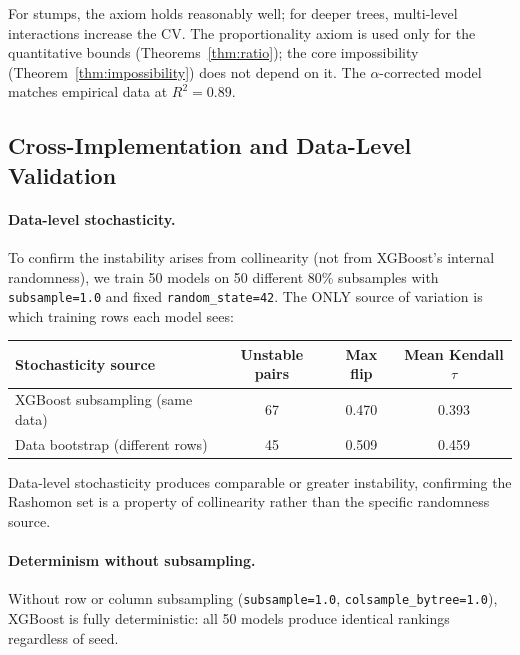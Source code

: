 \documentclass{jmlr}
\begin{document}
For stumps, the axiom holds reasonably well; for deeper trees, multi-level interactions increase the CV. The proportionality axiom is used only for the quantitative bounds (Theorems~\ref{thm:ratio}); the core impossibility (Theorem~\ref{thm:impossibility}) does not depend on it. The $\alpha$-corrected model matches empirical data at $R^2 = 0.89$.

\subsection{Cross-Implementation and Data-Level Validation}

\paragraph{Data-level stochasticity.}
To confirm the instability arises from collinearity (not from XGBoost's internal randomness), we train 50 models on 50 different 80\% subsamples with \texttt{subsample=1.0} and fixed \texttt{random\_state=42}. The ONLY source of variation is which training rows each model sees:

\begin{center}
\small
\begin{tabular}{@{}lccc@{}}
\toprule
Stochasticity source & Unstable pairs & Max flip & Mean Kendall $\tau$ \\
\midrule
XGBoost subsampling (same data) & 67 & 0.470 & 0.393 \\
Data bootstrap (different rows) & 45 & 0.509 & 0.459 \\
\bottomrule
\end{tabular}
\end{center}

\begin{sloppypar}
Data-level stochasticity produces comparable or greater instability, confirming the Rashomon set is a property of collinearity rather than the specific randomness source.
\end{sloppypar}

\paragraph{Determinism without subsampling.}
\begin{sloppypar}
Without row or column subsampling (\texttt{subsample=1.0}, \texttt{colsample\_bytree=1.0}), XGBoost is fully deterministic: all 50 models produce identical rankings regardless of seed.
\end{sloppypar}
\end{document}

